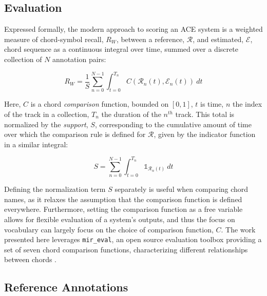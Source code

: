 \documentclass{article}
\begin{document}
\subsection{Evaluation}
\label{subsec:eval}

Expressed formally, the modern approach to scoring an ACE system is a weighted measure of chord-symbol recall, $R_{W}$, between a reference, $\mathcal{R}$, and estimated, $\mathcal{E}$, chord sequence as a continuous integral over time, summed over a discrete collection of $N$ annotation pairs:

\begin{equation}
\label{eq:recall_micro}
R_{W} = \frac{1}{S}\sum_{n=0}^{N-1}\int_{t=0}^{T_n}C(\mathcal{R}_n(t), \mathcal{E}_n(t))~dt
\end{equation}

\noindent Here, $C$ is a chord \emph{comparison} function, bounded on $[0, 1]$, $t$ is time, $n$ the index of the track in a collection, $T_n$ the duration of the $n^{th}$ track. This total is normalized by the \emph{support}, $S$, corresponding to the cumulative amount of time over which the comparison rule is defined for $\mathcal{R}$, given by the indicator function in a similar integral:

\begin{equation}
S = \sum_{n=0}^{N-1}\int_{t=0}^{T_n}\mathds{1}_{\mathcal{R}_n(t)}~dt
\end{equation}

Defining the normalization term $S$ separately is useful when comparing chord names, as it relaxes the assumption that the comparison function is defined everywhere.
Furthermore, setting the comparison function as a free variable allows for flexible evaluation of a system's outputs, and thus the focus on vocabulary can largely focus on the choice of comparison function, $C$.
The work presented here leverages \texttt{mir\_eval}, an open source evaluation toolbox providing a set of seven chord comparison functions, characterizing different relationships between chords \cite{Raffel2014Eval}.


\subsection{Reference Annotations}
\label{subsec:data}

\end{document}
